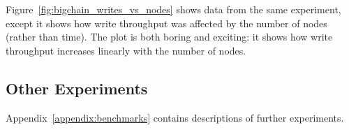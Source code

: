 Figure~\ref{fig:bigchain_writes_vs_nodes} shows data from the same experiment, except it shows how write throughput was affected by the number of nodes (rather than time).
The plot is both boring and exciting: it shows how write throughput increases linearly with the number of nodes.

\subsection{Other Experiments}
Appendix~\ref{appendix:benchmarks} contains descriptions of further experiments.